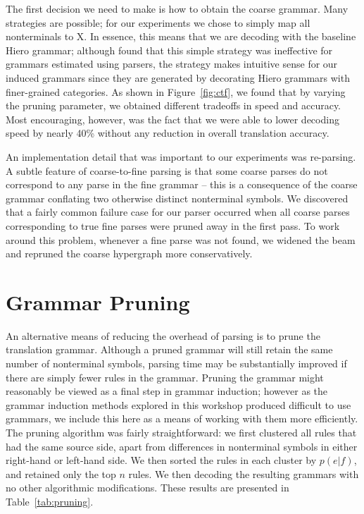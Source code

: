 The first decision we need to make is how to obtain the coarse grammar.  Many strategies are possible; for our experiments we chose to simply map all nonterminals to X.  In essence, this means that we are decoding with the baseline Hiero grammar; although \citet{denero-EtAl:2009:NAACLHLT09} found that this simple strategy was ineffective for grammars estimated using parsers, the strategy makes intuitive sense for our induced grammars since they are generated by decorating Hiero grammars with finer-grained categories.  As shown in Figure~\ref{fig:ctf}, we found that by varying the pruning parameter, we obtained different tradeoffs in speed and accuracy.  Most encouraging, however, was the fact that we were able to lower decoding speed by nearly 40\% without any reduction in overall translation accuracy.

An implementation detail that was important to our experiments was re-parsing.  A subtle feature of coarse-to-fine parsing is that some coarse parses do not correspond to any parse in the fine grammar -- this is a consequence of the coarse grammar conflating two otherwise distinct nonterminal symbols.  We discovered that a fairly common failure case for our parser occurred when all coarse parses corresponding to true fine parses were pruned away in the first pass.  To work around this problem, whenever a fine parse was not found, we widened the beam and repruned the coarse hypergraph more conservatively.

\section{Grammar Pruning}\label{sec:pruning}

An alternative means of reducing the overhead of parsing is to prune the translation grammar.  Although a pruned grammar will still retain the same number of nonterminal symbols, parsing time may be substantially improved if there are simply fewer rules in the grammar.  Pruning the grammar might reasonably be viewed as a final step in grammar induction; however as the grammar induction methods explored in this workshop produced difficult to use grammars, we include this here as a means of working with them more efficiently.  The pruning algorithm was fairly straightforward: we first clustered all rules that had the same source side, apart from differences in nonterminal symbols in either right-hand or left-hand side. We then sorted the rules in each cluster by $p(e|f)$, and retained only the top $n$
rules.  We then decoding the resulting grammars with no other algorithmic modifications.  These results are presented in Table~\ref{tab:pruning}.

